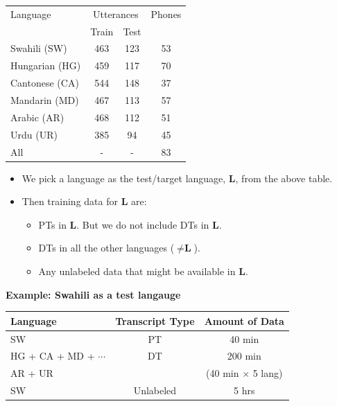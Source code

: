 \documentclass[landscape,paperwidth=58in,paperheight=40in,fontscale=0.285]{baposter} %
\begin{document}
\begin{poster}
{\begin{center}
\begin{tabular}{l|c c| c}
   \hline
Language &  \multicolumn{2}{c|}{Utterances}  & Phones \\
                 &  Train & Test &  \\ \hline
Swahili (SW)     & 463 & 123 & 53 \\
Hungarian (HG)    & 459 & 117 & 70 \\
Cantonese (CA)  & 544 & 148 &  37 \\
Mandarin (MD) & 467 & 113 &  57 \\
Arabic (AR) & 468 & 112 &  51 \\
Urdu (UR) & 385 & 94 &  45 \\ \hline
All & - & - & 83 \\ \hline
\end{tabular}
\end{center}

\begin{itemize}
\item We pick a language as the test/target language, $\textbf{L}$, from the above table.
\item Then training data for $\textbf{L}$ are:
\begin{itemize}
\item PTs in $\textbf{L}$. But we do not include DTs in $\textbf{L}$.
\item DTs in all the other languages ($\ne \textbf{L}$).
\item Any unlabeled data that might be available in $\textbf{L}$.
\end{itemize}
\end{itemize}

\textbf{Example: Swahili as a test langauge}
\vspace{-5mm}
\begin{center}
\begin{tabular}{l|c|c}
   \hline
Language &   Transcript Type & Amount of Data \\ \hline
SW  & PT  & 40 min \\
HG + CA + MD + $\cdots$  & DT & 200 min  \\
AR + UR          &    & (40 min $\times$ 5 lang) \\
SW  & Unlabeled  &  5 hrs \\ \hline
\end{tabular}
\end{center}

}
\end{poster}
\end{document}
